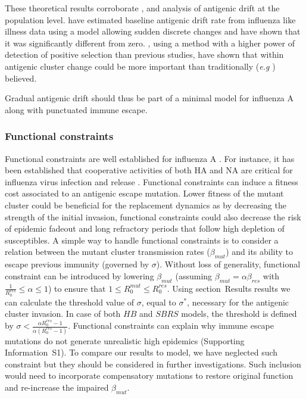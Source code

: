 These theoretical results corroborate \citet{Finkenstaedt2005},
\citet{Shih2007} and \citet{Suzuki2008} analysis of antigenic drift at
the population level.  \citet{Finkenstaedt2005} have estimated
baseline antigenic drift rate from influenza like illness data using a
model allowing sudden discrete changes and have shown that it was
significantly different from zero. \citet{Shih2007}, using a method
with a higher power of detection of positive selection than previous
studies, have shown that within antigenic cluster change could be more
important than traditionally (\textit{e.g} \citet{Wolf2006}) believed.

Gradual antigenic drift should thus be part of a minimal model for
influenza A along with punctuated immune escape.


\subsubsection{Functional constraints}

Functional constraints are well established for influenza A
\citep{Rambaut2008, Gog2008, Du2008}. For instance, it has been
established that cooperative activities of both HA and NA are critical
for influenza virus infection and release \citep{Wagner2002}.
Functional constraints can induce a fitness cost associated to an
antigenic escape mutation. Lower fitness of the mutant cluster could
be beneficial for the replacement dynamics as by decreasing the
strength of the initial invasion, functional constraints could also
decrease the risk of epidemic fadeout and long refractory periods that
follow high depletion of susceptibles. %
A simple way to handle functional constraints is to consider a
relation between the mutant cluster transmission rates ($\beta_{mut}$)
and its ability to escape previous immunity (governed by $\sigma$).
Without loss of generality, functional constraint can be introduced by
lowering $\beta_{mut}$ (assuming $\beta_{mut}=\alpha \beta_{res}$ with
$\frac{1}{R_0^{res}} \leq \alpha \leq 1$) to ensure that $1 \leq
R_0^{mut} \leq R_0^{res}$. Using section~Results results we can
calculate the threshold value of $\sigma$, equal to $\sigma^*$,
necessary for the antigenic cluster invasion. In case of both $HB$ and
$SBRS$ models, the threshold is defined by $\sigma < \frac{\alpha
  R_0^{res}-1}{\alpha (R_0^{res} -1)}$. Functional constraints can
explain why immune escape mutations do not generate unrealistic high
epidemics (Supporting Information~S1). To compare our results to
\citet{Koelle2006} model, we have neglected such constraint but they
should be considered in further investigations. Such inclusion would
need to incorporate compensatory mutations \citep{Du2008} to restore
original function and re-increase the impaired $\beta_{mut}$.
\\

